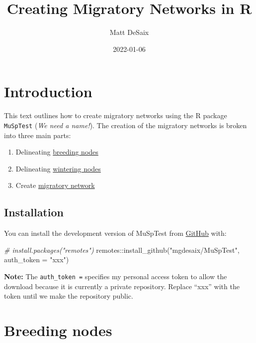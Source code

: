 \documentclass[
]{book}
\title{Creating Migratory Networks in R}
\author{Matt DeSaix}
\date{2022-01-06}
\newenvironment{Shaded}{\begin{snugshade}}{\end{snugshade}}
\newcommand{\AttributeTok}[1]{\textcolor[rgb]{0.77,0.63,0.00}{#1}}
\newcommand{\CommentTok}[1]{\textcolor[rgb]{0.56,0.35,0.01}{\textit{#1}}}
\newcommand{\FunctionTok}[1]{\textcolor[rgb]{0.00,0.00,0.00}{#1}}
\newcommand{\NormalTok}[1]{#1}
\newcommand{\SpecialCharTok}[1]{\textcolor[rgb]{0.00,0.00,0.00}{#1}}
\newcommand{\StringTok}[1]{\textcolor[rgb]{0.31,0.60,0.02}{#1}}
\providecommand{\tightlist}{%
  \setlength{\itemsep}{0pt}\setlength{\parskip}{0pt}}
\begin{document}
\maketitle

{
\setcounter{tocdepth}{1}
\tableofcontents
}
\hypertarget{introduction}{%
\chapter{Introduction}\label{introduction}}

This text outlines how to create migratory networks using the R package \texttt{MuSpTest} (\emph{We need a name!}). The creation of the migratory networks is broken into three main parts:

\begin{enumerate}
\def\labelenumi{\arabic{enumi}.}
\tightlist
\item
  Delineating \protect\hyperlink{breeding}{breeding nodes}
\item
  Delineating \protect\hyperlink{wintering}{wintering nodes}
\item
  Create \protect\hyperlink{connectivity}{migratory network}
\end{enumerate}

\hypertarget{installation}{%
\section{Installation}\label{installation}}

You can install the development version of MuSpTest from \href{https://github.com/}{GitHub} with:

\begin{Shaded}
\begin{Highlighting}[]
\CommentTok{\# install.packages("remotes")}
\NormalTok{remotes}\SpecialCharTok{::}\FunctionTok{install\_github}\NormalTok{(}\StringTok{"mgdesaix/MuSpTest"}\NormalTok{, }\AttributeTok{auth\_token =} \StringTok{"xxx"}\NormalTok{)}
\end{Highlighting}
\end{Shaded}

\textbf{Note:} The \texttt{auth\_token\ =} specifies my personal access token to allow the download because it is currently a private repository. Replace ``xxx'' with the token until we make the repository public.

\hypertarget{breeding}{%
\chapter{Breeding nodes}\label{breeding}}
\end{document}
